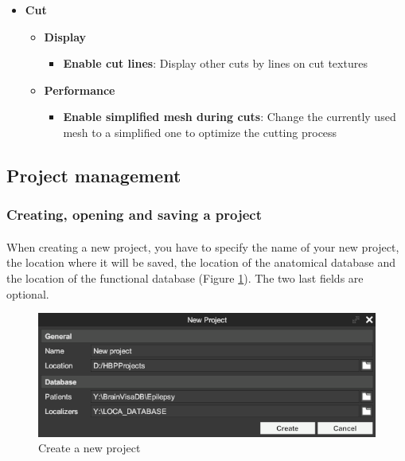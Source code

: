 \documentclass[a4paper]{article}
\begin{document}
\begin{itemize}
\begin{itemize}
\begin{itemize}
\begin{itemize}
\end{itemize}
\end{itemize}
\item \textbf{Cut}
\begin{itemize}
\item \textbf{Display}
\begin{itemize}
\item \textbf{Enable cut lines}: Display other cuts by lines on cut textures
\end{itemize}
\item \textbf{Performance}
\begin{itemize}
\item \textbf{Enable simplified mesh during cuts}: Change the currently used mesh to a simplified one to optimize the cutting process
\end{itemize}
\end{itemize}
\end{itemize}
\end{itemize}
\subsection{Project management}
\subsubsection{Creating, opening and saving a project}
\paragraph{} When creating a new project, you have to specify the name of your new project, the location where it will be saved, the location of the anatomical database and the location of the functional database (Figure \ref{newProjectUI}). The two last fields are optional.
\begin{figure}[H]
\begin{center}
\includegraphics[scale=0.5]{NewProject.png}
\end{center}
\caption{\label{newProjectUI}Create a new project}
\end{figure}
\end{document}

